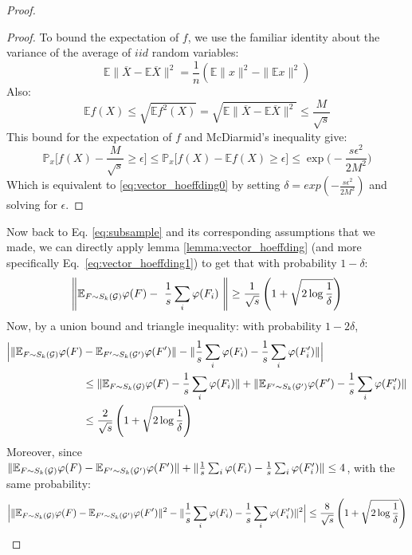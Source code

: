 \begin{proof}
\begin{proof}
To bound the expectation of $f$, we use the familiar identity about the variance of the average of $iid$ random variables:
\begin{equation}
\mathbb{E}\|\overline{X}-\mathbb{E}\overline{X}\|^2=\frac{1}{n}(\mathbb{E}\|x\|^2-\|\mathbb{E}x\|^2 ) 
\end{equation}
Also:
\[ \mathbb{E}f(X)\leq\sqrt{\mathbb{E}f^2(X)}=\sqrt{\mathbb{E}\|\overline{X}-\mathbb{E}\overline{X}\|^2}\leq \frac{M}{\sqrt{{s}}}\]
This bound for the expectation of $f$ and McDiarmid's inequality give: 
\begin{equation}
\label{eq:vector_hoeffding1}
    \mathbb{P}_x \Big [ f(X)-\frac{M}{\sqrt{{s}}}\geq \epsilon \Big ]\leq
    \mathbb{P}_x \Big [ f(X)-\mathbb{E}f(X)\geq \epsilon \Big ]\leq
    \exp\Big( -\frac{{s}\epsilon^2}{2M^2}\Big)
\end{equation}
Which is equivalent to \eqref{eq:vector_hoeffding0} by setting $\delta=exp( -\frac{{s}\epsilon^2}{2M^2})$ and solving for $\epsilon$.
\end{proof}
Now back to Eq. \eqref{eq:subsample} and its corresponding assumptions that we made, we can directly apply lemma \ref{lemma:vector_hoeffding} (and more specifically Eq.~\eqref{eq:vector_hoeffding1}) to get that with probability $1-\delta$:
\begin{equation}
    \label{eq:fixed_w}
    \left\|\mathbb{E}_{F \sim S_k(\mathcal{G})} \varphi(F)-~\frac{1}{s} \sum_i \varphi(F_i)~\right\|\geq \frac{1}{\sqrt{{s}}}\left(1+\sqrt{2\log\frac{1}{\delta}}\right)
\end{equation}
Now, by a union bound and triangle inequality: with probability $1-2\delta$,
\begin{align*}
    \Big | \| \mathbb{E}_{F \sim S_k(\mathcal{G})} \varphi(F)& - \mathbb{E}_{F' \sim S_k(\mathcal{G}')} \varphi(F')\| - \| \frac{1}{{s}} \sum_i \varphi(F_i) - \frac{1}{{s}} \sum_i \varphi(F'_i)\|\Big | \\
    &\leq  \| \mathbb{E}_{F \sim S_k(\mathcal{G})} \varphi(F) -  \frac{1}{{s}} \sum_i \varphi(F_i) \| + \|\mathbb{E}_{F' \sim S_k(\mathcal{G}')} \varphi(F') - \frac{1}{{s}} \sum_i \varphi(F'_i)\| \\
    &\leq \frac{2}{\sqrt{{s}}}\left(1+\sqrt{2\log\frac{1}{\delta}}\right)
\end{align*}
Moreover, since $\| \mathbb{E}_{F \sim S_k(\mathcal{G})} \varphi(F)- \mathbb{E}_{F' \sim S_k(\mathcal{G}')} \varphi(F')\| + \| \frac{1}{{s}} \sum_i \varphi(F_i) - \frac{1}{{s}} \sum_i \varphi(F'_i)\| \leq 4$, with the same probability:
\begin{equation}\label{eq:step2}
    \Big | \| \mathbb{E}_{F \sim S_k(\G)} \varphi(F) - \mathbb{E}_{F' \sim S_k(\G')} \varphi(F')\|^2 - \| \frac{1}{{s}} \sum_i \varphi(F_i) - \frac{1}{{s}} \sum_i \varphi(F'_i)\|^2\Big | \leq \frac{8}{\sqrt{{s}}}\left(1+\sqrt{2\log\frac{1}{\delta}}\right)

\end{equation}
\end{proof}
